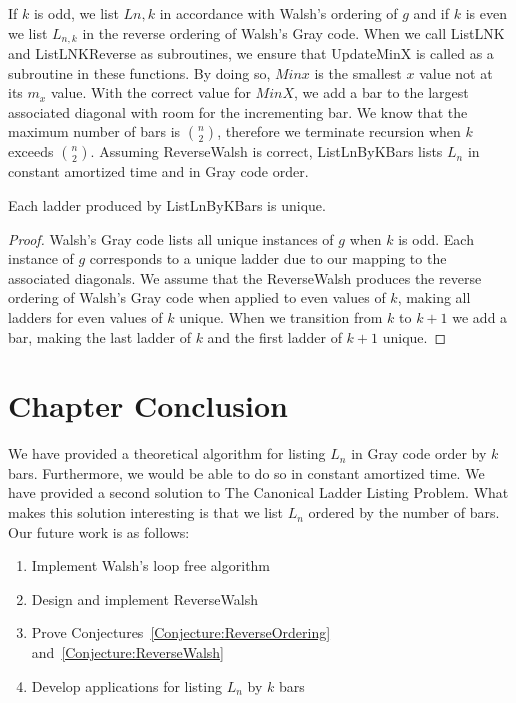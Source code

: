 If $k$ is odd, we list $L{n,k}$ in accordance with Walsh's ordering of $g$ and if $k$ is even 
we list $L_{n,k}$ in the reverse ordering of Walsh's Gray code. When we call {\sc ListLNK} and {\sc ListLNKReverse} 
as subroutines, we ensure that {\sc UpdateMinX} is called as a subroutine in these functions. By doing so, $Minx$ 
is the smallest $x$ value not at its $m_{x}$ value. With the correct value for $MinX$, we 
add a bar to the largest associated diagonal with 
room for the incrementing bar. We know that the maximum number of bars is ${n \choose 2}$, therefore we terminate 
recursion when $k$ exceeds ${n \choose 2}$. Assuming {\sc ReverseWalsh} is correct, {\sc ListLnByKBars} lists $L_{n}$ in constant amortized 
time and in Gray code order. 
\begin{lemma}
  Each ladder produced by {\sc ListLnByKBars} is unique. 
  \label{Lemma:LNKUnique}
\end{lemma}
\begin{proof}
  Walsh's Gray code lists all unique instances of $g$ when $k$ is odd. Each instance of $g$ 
  corresponds to a unique ladder due to our mapping to the associated diagonals. We assume that the {\sc ReverseWalsh}
  produces the reverse ordering of Walsh's Gray code when applied to even values of $k$, making all ladders for even values of $k$ 
  unique. When we transition from $k$ to $k+1$ we add a bar, making the last ladder of $k$ and the first ladder of $k+1$ unique.
\end{proof}
\section{Chapter Conclusion}
We have provided a theoretical algorithm for listing $L_{n}$ in Gray code order by $k$ bars. Furthermore, we would 
be able to do so in constant amortized time. We have provided a second solution to The Canonical Ladder Listing Problem. 
What makes this solution interesting is that we list $L_{n}$ ordered by the number of bars. Our future work is as follows:
\begin{enumerate}
  \item Implement Walsh's loop free algorithm
  \item Design and implement {\sc ReverseWalsh}
  \item Prove Conjectures~\ref{Conjecture:ReverseOrdering} and~\ref{Conjecture:ReverseWalsh}
  \item Develop applications for listing $L_{n}$ by $k$ bars
\end{enumerate}


